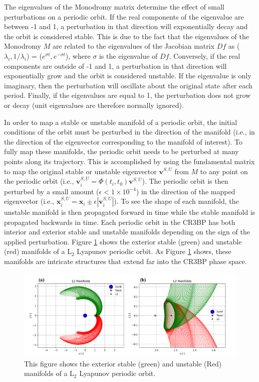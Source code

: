 \documentclass[11pt]{article} %
\begin{document}
\noindent
The eigenvalues of the Monodromy matrix determine the effect of small perturbations on a periodic orbit. If the real components of the eigenvalue are between -1 and 1, a perturbation in that direction will exponentially decay and the orbit is considered stable. This is due to the fact that the eigenvalues of the Monodromy $M$ are related to the eigenvalues of the Jacobian matrix $Df$ as ($\lambda_i,1/\lambda_i$) = ($e^{\sigma t}, e^{-\sigma t}$), where $\sigma$ is the eigenvalue of $Df$. Conversely, if the real components are outside of -1 and 1, a perturbation in that direction will exponentially grow and the orbit is considered unstable. If the eigenvalue is only imaginary, then the perturbation will oscillate about the original state after each period. Finally, if the eigenvalues are equal to 1, the perturbation does not grow or decay (unit eigenvalues are therefore normally ignored).

In order to map a stable or unstable manifold of a periodic orbit, the initial conditions of the orbit must be perturbed in the direction of the manifold (i.e., in the direction of the eigenvector corresponding to the manifold of interest). To fully map these manifolds, the periodic orbit needs to be perturbed at many points along its trajectory. This is accomplished by using the fundamental matrix to map the original stable or unstable eigenvector $\bm{v}^{S,U}$ from $M$ to any point on the periodic orbit (i.e., $\bm{v}_i^{S,U}=\Phi\left(t_i,t_0\right)\bm{v}^{S,U}$). The periodic orbit is then perturbed by a small amount ($\epsilon < 1\times10^{-4}$) in the direction of the mapped eigenvector (i.e., $\bm{x}_{i}^{S,U}=\bm{x}_{i}\pm\epsilon|\bm{v}_i^{S,U}|$). To see the shape of each manifold, the unstable manifold is then propagated forward in time while the stable manifold is propagated backwards in time. Each periodic orbit in the CR3BP has both interior and exterior stable and unstable manifolds depending on the sign of the applied perturbation. Figure \ref{f:manifolds} shows the exterior stable (green) and unstable (red) manifolds of a L$_2$ Lyapunov periodic orbit. As Figure \ref{f:manifolds} shows, these manifolds are intricate structures that extend far into the CR3BP phase space. 

\begin{figure}[H]
    \centering
    \includegraphics[width=\textwidth]{manifold_comb.png}
    \caption{This figure shows the exterior stable (green) and unstable (Red) manifolds of a L$_2$ Lyapunov periodic orbit.}
    \label{f:manifolds}
\end{figure}
\end{document}
